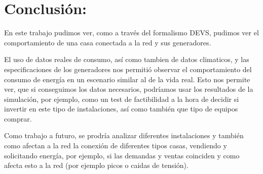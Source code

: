 \section{Conclusión:}
En este trabajo pudimos ver, como a través del formalismo DEVS, pudimos ver el comportamiento de una
casa conectada a la red y sus generadores.

El uso de datos reales de consumo, así como tambien de datos climaticos, y las especificaciones de los
generadores nos permitió observar el comportamiento del consumo de energía en un escenario similar al
de la vida real. Esto nos permite ver, que si conseguimos los datos necesarios, podríamos usar los 
resultados de la simulación, por ejemplo, como un test de factibilidad a la hora de decidir si invertir
en este tipo de instalaciones, así como también que tipo de equipos comprar.

Como trabajo a futuro, se prodría analizar diferentes instalaciones y también como afectan a la red 
la conexión de diferentes tipos casas, vendiendo y solicitando energía, por ejemplo, si las demandas y 
ventas coinciden y como afecta esto a la red (por ejemplo picos o caidas de tensión).